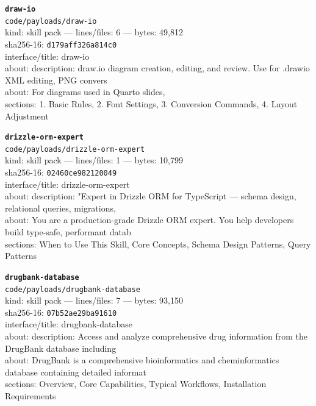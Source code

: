 \noindent\textbf{\texttt{draw-io}}\\
\texttt{code/payloads/draw-io}\\
kind: skill pack --- lines/files: 6 --- bytes: 49,812\\
sha256-16: \texttt{d179aff326a814c0}\\
interface/title: draw-io\\
about: description: draw.io diagram creation, editing, and review. Use for .drawio XML editing, PNG convers\\
about: For diagrams used in Quarto slides,\\
sections: 1. Basic Rules, 2. Font Settings, 3. Conversion Commands, 4. Layout Adjustment\\
\vspace*{6.0pt}
\newpage

\noindent\textbf{\texttt{drizzle-orm-expert}}\\
\texttt{code/payloads/drizzle-orm-expert}\\
kind: skill pack --- lines/files: 1 --- bytes: 10,799\\
sha256-16: \texttt{02460ce982120049}\\
interface/title: drizzle-orm-expert\\
about: description: "Expert in Drizzle ORM for TypeScript — schema design, relational queries, migrations, \\
about: You are a production-grade Drizzle ORM expert. You help developers build type-safe, performant datab\\
sections: When to Use This Skill, Core Concepts, Schema Design Patterns, Query Patterns\\
\vspace*{6.0pt}

\noindent\textbf{\texttt{drugbank-database}}\\
\texttt{code/payloads/drugbank-database}\\
kind: skill pack --- lines/files: 7 --- bytes: 93,150\\
sha256-16: \texttt{07b52ae29ba91610}\\
interface/title: drugbank-database\\
about: description: Access and analyze comprehensive drug information from the DrugBank database including \\
about: DrugBank is a comprehensive bioinformatics and cheminformatics database containing detailed informat\\
sections: Overview, Core Capabilities, Typical Workflows, Installation Requirements\\
\vspace*{6.0pt}

